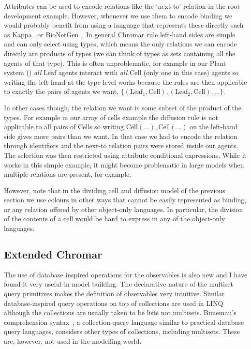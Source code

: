 Attributes can be used to encode relations like the `next-to' relation in the
root development example.  However, whenever we use them to encode binding we
would probably benefit from using a language that represents these directly
such as Kappa~\citep{danos_rule-based_2008} or
BioNetGen~\citep{blinov_bionetgen:_2004}. In general Chromar rule left-hand
sides are simple and can only select using types, which means the only relations
we can encode directly are products of types (we can think of types as sets
containing all the agents of that type). This is often unproblematic, for
example in our Plant system () \textit{all} $\mathrm{Leaf}$
agents interact with \textit{all} $\mathrm{Cell}$ (only one in this case) agents
so writing the left-hand at the type level works because the rules are then
applicable to exactly the pairs of agents we want,
$\{ (\mathrm{Leaf}_1, \mathrm{Cell}), (\mathrm{Leaf}_2, \mathrm{Cell}), \dots
\}$.

In other cases though, the relation we want is some subset of the product of the
types. For example in our array of cells example the diffusion rule is not
applicable to all pairs of $\mathrm{Cell}$s so writing
$\mathrm{Cell}(\dots), \mathrm{Cell}(\dots)$ on the left-hand side gives more
pairs than we want.  In that case we had to encode the relation through
identifiers and the next-to relation pairs were stored inside our agents. The
selection was then restricted using attribute conditional expressions. While it
works in this simple example, it might become problematic in large models when
multiple relations are present, for example.

However, note that in the dividing cell and diffusion model of the previous
section we use colours in other ways that cannot be easily represented as
binding, or any relation offered by other object-only languages. In particular,
the division of the contents of a cell would be hard to express in any of the
object-only languages.


\subsection{Extended Chromar}
The use of database inspired operations for the observables is also new and I
have found it very useful in model building. The declarative nature of the
multiset query primitives makes the definition of observables very
intuitive. Similar database-inspired query operations on top of collections are
used in LINQ~\citep{budiu_compiler_2013} although the collections are usually taken
to be lists not multisets. Buneman's comprehension
syntax~\citep{buneman_comprehension_1994}, a collection query language similar to
practical database query languages, considers other types of collections,
including multisets. These are, however, not used in the modelling world.

